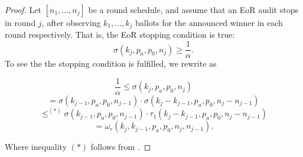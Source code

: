 \begin{proof}
Let $[n_1, \ldots, n_j]$ be a round schedule, and assume that an EoR \BRAVO audit stops in round $j$, after observing $k_1, \ldots, k_j$ ballots for the announced winner in each round respectively.
That is, the EoR \BRAVO stopping condition is true:
$$\sigma(k_j,p_a,p_0,n_j) \ge \frac{1}{\alpha}.$$
To see the the \Providence stopping condition is fulfilled, we rewrite as 




\[
 \frac{1}{\alpha} \leq \sigma(k_{j}, p_a, p_0, n_{j}) 
\]
\[
 = \sigma(k_{j-1}, p_a, p_0, n_{j-1}) \cdot \sigma(k_j - k_{j-1}, p_a, p_0, n_j - n_{j-1})  
\]
\[
 \leq^{(*)} \sigma(k_{j-1}, p_a, p_0, n_{j-1}) \cdot \tau_1(k_j - k_{j-1}, p_a, p_0, n_j - n_{j-1}) 
\]
\[
 = \omega_r(k_j, k_{j-1}, p_a, p_0, n_j, n_{j-1}).
\]

Where inequality $(*)$ follows from \cite[Theorem 6]{athena}.


% 
% 
% 




\end{proof}
